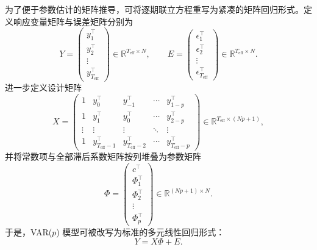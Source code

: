 为了便于参数估计的矩阵推导，可将逐期联立方程重写为紧凑的矩阵回归形式。定义响应变量矩阵与误差矩阵分别为
\begin{equation}
 Y=
 \begin{pmatrix}
 y_1^{\top}\\
 y_2^{\top}\\
 \vdots\\
 y_{T_{\mathrm{eff}}}^{\top}
 \end{pmatrix}
 \in\mathbb{R}^{T_{\mathrm{eff}}\times N},
 \qquad
 E=
 \begin{pmatrix}
 \epsilon_1^{\top}\\
 \epsilon_2^{\top}\\
 \vdots\\
 \epsilon_{T_{\mathrm{eff}}}^{\top}
 \end{pmatrix}
 \in\mathbb{R}^{T_{\mathrm{eff}}\times N}.
\end{equation}
进一步定义设计矩阵
\begin{equation}
 X=
 \begin{pmatrix}
 1 & y_0^{\top} & y_{-1}^{\top} & \cdots & y_{1-p}^{\top}\\
 1 & y_1^{\top} & y_0^{\top} & \cdots & y_{2-p}^{\top}\\
 \vdots & \vdots & \vdots & \ddots & \vdots\\
 1 & y_{T_{\mathrm{eff}}-1}^{\top} & y_{T_{\mathrm{eff}}-2}^{\top} & \cdots & y_{T_{\mathrm{eff}}-p}^{\top}
 \end{pmatrix}
 \in\mathbb{R}^{T_{\mathrm{eff}}\times (Np+1)},
\end{equation}
并将常数项与全部滞后系数矩阵按列堆叠为参数矩阵
\begin{equation}
 \Phi=
 \begin{pmatrix}
 c^{\top}\\
 \Phi_1^{\top}\\
 \Phi_2^{\top}\\
 \vdots\\
 \Phi_p^{\top}
 \end{pmatrix}
 \in\mathbb{R}^{(Np+1)\times N}.
\end{equation}
于是，VAR($p$) 模型可被改写为标准的多元线性回归形式：
\begin{equation}
 Y=X\Phi+E.
\end{equation}

